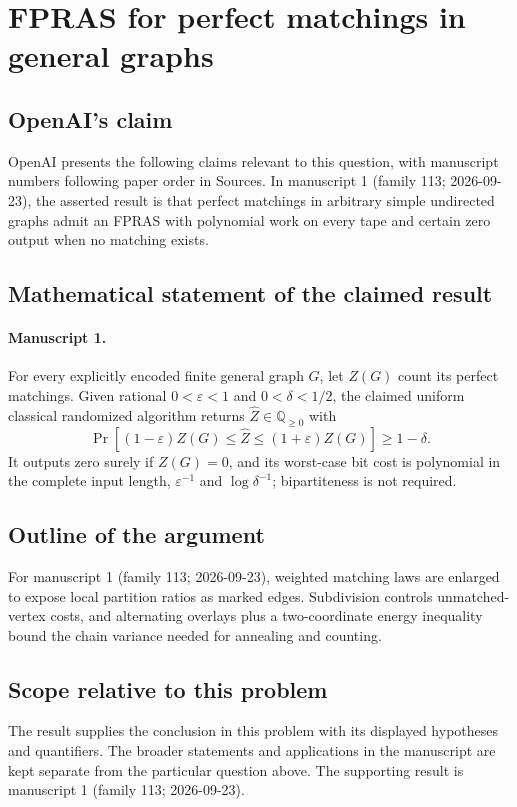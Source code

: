 \documentclass[11pt]{article}
\begin{document}
\section*{FPRAS for perfect matchings in general graphs}

\subsection{OpenAI's claim}
OpenAI presents the following claims relevant to this question, with manuscript numbers following paper order in Sources. In manuscript 1 (family 113; 2026-09-23), the asserted result is that perfect matchings in arbitrary simple undirected graphs admit an FPRAS with polynomial work on every tape and certain zero output when no matching exists.

\subsection{Mathematical statement of the claimed result}
\paragraph{Manuscript 1.}
For every explicitly encoded finite general graph $G$, let $Z(G)$ count its perfect matchings. Given rational $0<\varepsilon<1$ and $0<\delta<1/2$, the claimed uniform classical randomized algorithm returns $\widehat Z\in\mathbb Q_{\ge0}$ with
\[
 \Pr[(1-\varepsilon)Z(G)\le\widehat Z\le(1+\varepsilon)Z(G)]\ge1-\delta.
\]
It outputs zero surely if $Z(G)=0$, and its worst-case bit cost is polynomial in the complete input length, $\varepsilon^{-1}$ and $\log\delta^{-1}$; bipartiteness is not required.

\subsection{Outline of the argument}
For manuscript 1 (family 113; 2026-09-23), weighted matching laws are enlarged to expose local partition ratios as marked edges. Subdivision controls unmatched-vertex costs, and alternating overlays plus a two-coordinate energy inequality bound the chain variance needed for annealing and counting.

\subsection{Scope relative to this problem}
The result supplies the conclusion in this problem with its displayed hypotheses and quantifiers. The broader statements and applications in the manuscript are kept separate from the particular question above. The supporting result is manuscript 1 (family 113; 2026-09-23).
\end{document}
